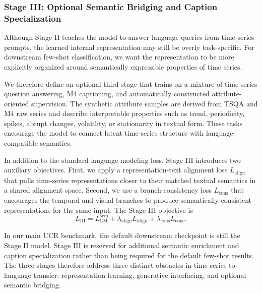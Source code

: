 \documentclass{article}
\begin{document}
        \subsubsection{Stage III: Optional Semantic Bridging and Caption Specialization}
        
        Although Stage II teaches the model to answer language queries from time-series prompts, the learned internal representation may still be overly task-specific.
        For downstream few-shot classification, we want the representation to be more explicitly organized around semantically expressible properties of time series.
        
        We therefore define an optional third stage that trains on a mixture of time-series question answering, M4 captioning, and automatically constructed attribute-oriented supervision.
        The synthetic attribute samples are derived from TSQA and M4 raw series and describe interpretable properties such as trend, periodicity, spikes, abrupt changes, volatility, or stationarity in textual form.
        These tasks encourage the model to connect latent time-series structure with language-compatible semantics.
        
        In addition to the standard language modeling loss, Stage III introduces two auxiliary objectives.
        First, we apply a representation-text alignment loss $L_{\mathrm{align}}$ that pulls time-series representations closer to their matched textual semantics in a shared alignment space.
        Second, we use a branch-consistency loss $L_{\mathrm{cons}}$ that encourages the temporal and visual branches to produce semantically consistent representations for the same input.
        The Stage III objective is
        \begin{equation}
        L_{\mathrm{III}}
        =
        L_{\mathrm{LM}}^{\mathrm{sem}}
        +
        \lambda_{\mathrm{align}} L_{\mathrm{align}}
        +
        \lambda_{\mathrm{cons}} L_{\mathrm{cons}}.
        \end{equation}
        
        In our main UCR benchmark, the default downstream checkpoint is still the Stage II model.
        Stage III is reserved for additional semantic enrichment and caption specialization rather than being required for the default few-shot results.
        The three stages therefore address three distinct obstacles in time-series-to-language transfer: representation learning, generative interfacing, and optional semantic bridging.
        
\end{document}
